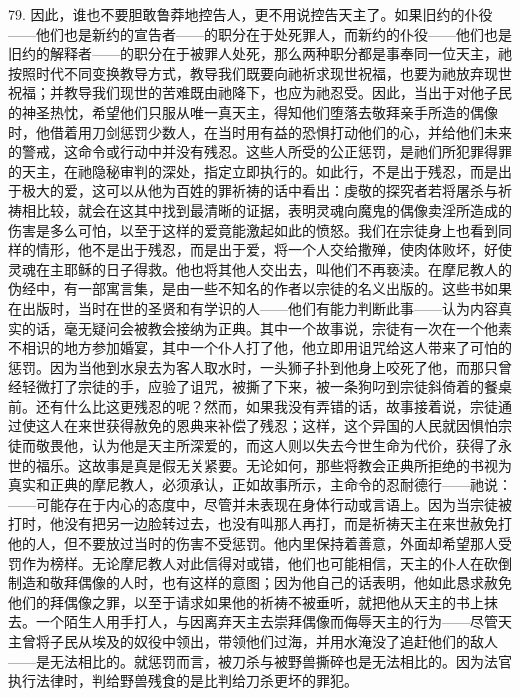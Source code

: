 79. 因此，谁也不要胆敢鲁莽地控告人，更不用说控告天主了。如果旧约的仆役——他们也是新约的宣告者——的职分在于处死罪人，而新约的仆役——他们也是旧约的解释者——的职分在于被罪人处死，那么两种职分都是事奉同一位天主，祂按照时代不同变换教导方式，教导我们既要向祂祈求现世祝福，也要为祂放弃现世祝福；并教导我们现世的苦难既由祂降下，也应为祂忍受。因此，当出于对他子民的神圣热忱，希望他们只服从唯一真天主，得知他们堕落去敬拜亲手所造的偶像时，他借着用刀剑惩罚少数人，在当时用有益的恐惧打动他们的心，并给他们未来的警戒，这命令或行动中并没有残忍。这些人所受的公正惩罚，是祂们所犯罪得罪的天主，在祂隐秘审判的深处，指定立即执行的。如此行，不是出于残忍，而是出于极大的爱，这可以从他为百姓的罪祈祷的话中看出：虔敬的探究者若将屠杀与祈祷相比较，就会在这其中找到最清晰的证据，表明灵魂向魔鬼的偶像卖淫所造成的伤害是多么可怕，以至于这样的爱竟能激起如此的愤怒。我们在宗徒身上也看到同样的情形，他不是出于残忍，而是出于爱，将一个人交给撒殚，使肉体败坏，好使灵魂在主耶稣的日子得救。他也将其他人交出去，叫他们不再亵渎。在摩尼教人的伪经中，有一部寓言集，是由一些不知名的作者以宗徒的名义出版的。这些书如果在出版时，当时在世的圣贤和有学识的人——他们有能力判断此事——认为内容真实的话，毫无疑问会被教会接纳为正典。其中一个故事说，宗徒有一次在一个他素不相识的地方参加婚宴，其中一个仆人打了他，他立即用诅咒给这人带来了可怕的惩罚。因为当他到水泉去为客人取水时，一头狮子扑到他身上咬死了他，而那只曾经轻微打了宗徒的手，应验了诅咒，被撕了下来，被一条狗叼到宗徒斜倚着的餐桌前。还有什么比这更残忍的呢？然而，如果我没有弄错的话，故事接着说，宗徒通过使这人在来世获得赦免的恩典来补偿了残忍；这样，这个异国的人民就因惧怕宗徒而敬畏他，认为他是天主所深爱的，而这人则以失去今世生命为代价，获得了永世的福乐。这故事是真是假无关紧要。无论如何，那些将教会正典所拒绝的书视为真实和正典的摩尼教人，必须承认，正如故事所示，主命令的忍耐德行——祂说：——可能存在于内心的态度中，尽管并未表现在身体行动或言语上。因为当宗徒被打时，他没有把另一边脸转过去，也没有叫那人再打，而是祈祷天主在来世赦免打他的人，但不要放过当时的伤害不受惩罚。他内里保持着善意，外面却希望那人受罚作为榜样。无论摩尼教人对此信得对或错，他们也可能相信，天主的仆人在砍倒制造和敬拜偶像的人时，也有这样的意图；因为他自己的话表明，他如此恳求赦免他们的拜偶像之罪，以至于请求如果他的祈祷不被垂听，就把他从天主的书上抹去。一个陌生人用手打人，与因离弃天主去崇拜偶像而侮辱天主的行为——尽管天主曾将子民从埃及的奴役中领出，带领他们过海，并用水淹没了追赶他们的敌人——是无法相比的。就惩罚而言，被刀杀与被野兽撕碎也是无法相比的。因为法官执行法律时，判给野兽残食的是比判给刀杀更坏的罪犯。\par

